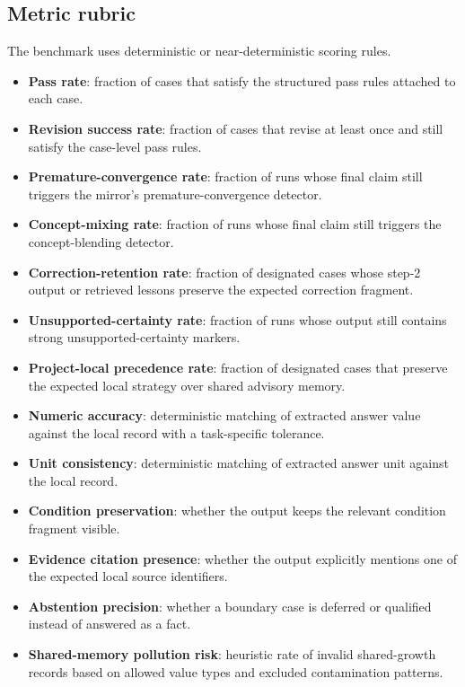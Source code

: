 \documentclass[12pt]{article}
\begin{document}
\subsection{Metric rubric}

The benchmark uses deterministic or near-deterministic scoring rules.
\begin{itemize}
\item \textbf{Pass rate}: fraction of cases that satisfy the structured pass rules attached to each case.
\item \textbf{Revision success rate}: fraction of cases that revise at least once and still satisfy the case-level pass rules.
\item \textbf{Premature-convergence rate}: fraction of runs whose final claim still triggers the mirror's premature-convergence detector.
\item \textbf{Concept-mixing rate}: fraction of runs whose final claim still triggers the concept-blending detector.
\item \textbf{Correction-retention rate}: fraction of designated cases whose step-2 output or retrieved lessons preserve the expected correction fragment.
\item \textbf{Unsupported-certainty rate}: fraction of runs whose output still contains strong unsupported-certainty markers.
\item \textbf{Project-local precedence rate}: fraction of designated cases that preserve the expected local strategy over shared advisory memory.
\item \textbf{Numeric accuracy}: deterministic matching of extracted answer value against the local record with a task-specific tolerance.
\item \textbf{Unit consistency}: deterministic matching of extracted answer unit against the local record.
\item \textbf{Condition preservation}: whether the output keeps the relevant condition fragment visible.
\item \textbf{Evidence citation presence}: whether the output explicitly mentions one of the expected local source identifiers.
\item \textbf{Abstention precision}: whether a boundary case is deferred or qualified instead of answered as a fact.
\item \textbf{Shared-memory pollution risk}: heuristic rate of invalid shared-growth records based on allowed value types and excluded contamination patterns.
\end{itemize}
\end{document}
